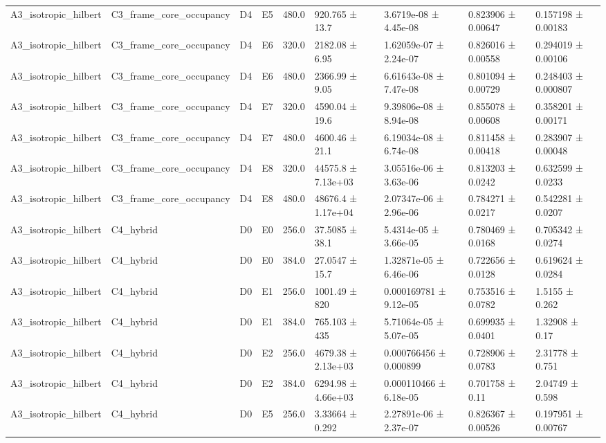 \begin{table}
\begin{tabular}{lllllllll}
A3\_isotropic\_hilbert & C3\_frame\_core\_occupancy & D4 & E5 & 480.0 & 920.765 ± 13.7 & 3.6719e-08 ± 4.45e-08 & 0.823906 ± 0.00647 & 0.157198 ± 0.00183 \\
A3\_isotropic\_hilbert & C3\_frame\_core\_occupancy & D4 & E6 & 320.0 & 2182.08 ± 6.95 & 1.62059e-07 ± 2.24e-07 & 0.826016 ± 0.00558 & 0.294019 ± 0.00106 \\
A3\_isotropic\_hilbert & C3\_frame\_core\_occupancy & D4 & E6 & 480.0 & 2366.99 ± 9.05 & 6.61643e-08 ± 7.47e-08 & 0.801094 ± 0.00729 & 0.248403 ± 0.000807 \\
A3\_isotropic\_hilbert & C3\_frame\_core\_occupancy & D4 & E7 & 320.0 & 4590.04 ± 19.6 & 9.39806e-08 ± 8.94e-08 & 0.855078 ± 0.00608 & 0.358201 ± 0.00171 \\
A3\_isotropic\_hilbert & C3\_frame\_core\_occupancy & D4 & E7 & 480.0 & 4600.46 ± 21.1 & 6.19034e-08 ± 6.74e-08 & 0.811458 ± 0.00418 & 0.283907 ± 0.00048 \\
A3\_isotropic\_hilbert & C3\_frame\_core\_occupancy & D4 & E8 & 320.0 & 44575.8 ± 7.13e+03 & 3.05516e-06 ± 3.63e-06 & 0.813203 ± 0.0242 & 0.632599 ± 0.0233 \\
A3\_isotropic\_hilbert & C3\_frame\_core\_occupancy & D4 & E8 & 480.0 & 48676.4 ± 1.17e+04 & 2.07347e-06 ± 2.96e-06 & 0.784271 ± 0.0217 & 0.542281 ± 0.0207 \\
A3\_isotropic\_hilbert & C4\_hybrid & D0 & E0 & 256.0 & 37.5085 ± 38.1 & 5.4314e-05 ± 3.66e-05 & 0.780469 ± 0.0168 & 0.705342 ± 0.0274 \\
A3\_isotropic\_hilbert & C4\_hybrid & D0 & E0 & 384.0 & 27.0547 ± 15.7 & 1.32871e-05 ± 6.46e-06 & 0.722656 ± 0.0128 & 0.619624 ± 0.0284 \\
A3\_isotropic\_hilbert & C4\_hybrid & D0 & E1 & 256.0 & 1001.49 ± 820 & 0.000169781 ± 9.12e-05 & 0.753516 ± 0.0782 & 1.5155 ± 0.262 \\
A3\_isotropic\_hilbert & C4\_hybrid & D0 & E1 & 384.0 & 765.103 ± 435 & 5.71064e-05 ± 5.07e-05 & 0.699935 ± 0.0401 & 1.32908 ± 0.17 \\
A3\_isotropic\_hilbert & C4\_hybrid & D0 & E2 & 256.0 & 4679.38 ± 2.13e+03 & 0.000766456 ± 0.000899 & 0.728906 ± 0.0783 & 2.31778 ± 0.751 \\
A3\_isotropic\_hilbert & C4\_hybrid & D0 & E2 & 384.0 & 6294.98 ± 4.66e+03 & 0.000110466 ± 6.18e-05 & 0.701758 ± 0.11 & 2.04749 ± 0.598 \\
A3\_isotropic\_hilbert & C4\_hybrid & D0 & E5 & 256.0 & 3.33664 ± 0.292 & 2.27891e-06 ± 2.37e-07 & 0.826367 ± 0.00526 & 0.197951 ± 0.00767 \\

\end{tabular}
\end{table}
